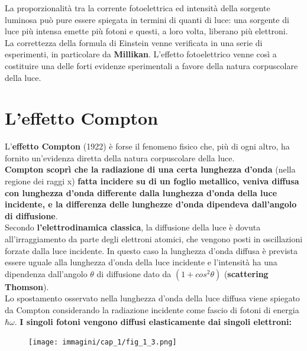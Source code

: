 La proporzionalità tra la corrente fotoelettrica ed intensità della sorgente luminosa può pure essere spiegata in termini di quanti di luce: una sorgente di luce più intensa emette più fotoni e questi, a loro volta, liberano più elettroni.\\

La correttezza della formula di Einstein venne verificata in una serie di esperimenti, in particolare da \textbf{Millikan}. L'effetto fotoelettrico venne così a costituire una delle forti evidenze sperimentali a favore della natura corpuscolare della luce.
\section{L'effetto Compton}
L'\textbf{effetto Compton} (1922) è forse il fenomeno fisico che, più di ogni altro, ha fornito un'evidenza diretta della natura corpuscolare della luce.\\

\textbf{Compton scoprì che la radiazione di una certa lunghezza d'onda} (nella regione dei raggi x) \textbf{fatta incidere su di un foglio metallico, veniva diffusa con lunghezza d'onda differente dalla lunghezza d'onda della luce incidente, e la differenza delle lunghezze d'onda dipendeva dall'angolo di diffusione}.\\

Secondo \textbf{l'elettrodinamica classica}, la diffusione della luce è dovuta all'irraggiamento da parte degli elettroni atomici, che vengono posti in oscillazioni forzate dalla luce incidente. In questo caso la lunghezza d'onda diffusa è prevista essere uguale alla lunghezza d'onda della luce incidente e l'intensità ha una dipendenza dall'angolo $\theta$ di diffusione dato da $(1+cos^2 \theta)$ (\textbf{scattering Thomson}).\\

Lo spostamento osservato nella lunghezza d'onda della luce diffusa viene spiegato da Compton considerando la radiazione incidente come fascio di fotoni di energia $\hbar \omega$. \textbf{I singoli fotoni vengono diffusi elasticamente dai singoli elettroni:}
	\begin{figure}[!htbp]
		\begin{center}
			\texttt{[image: immagini/cap\_1/fig\_1\_3.png]}
		\end{center}
	\end{figure}
	
